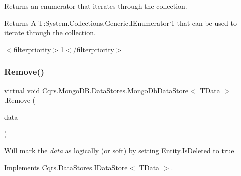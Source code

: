 Returns an enumerator that iterates through the collection. 

\begin{DoxyReturn}{Returns}
A T\+:\+System.\+Collections.\+Generic.\+I\+Enumerator`1 that can be used to iterate through the collection. 
\end{DoxyReturn}
$<$filterpriority$>$1$<$/filterpriority$>$ \mbox{\label{classCqrs_1_1MongoDB_1_1DataStores_1_1MongoDbDataStore_a14b43546e8d1e1832358e1cf2f8535f1_a14b43546e8d1e1832358e1cf2f8535f1}} 
\subsubsection{\texorpdfstring{Remove()}{Remove()}}
{\footnotesize\ttfamily virtual void \hyperlink{classCqrs_1_1MongoDB_1_1DataStores_1_1MongoDbDataStore}{Cqrs.\+Mongo\+D\+B.\+Data\+Stores.\+Mongo\+Db\+Data\+Store}$<$ T\+Data $>$.Remove (\begin{DoxyParamCaption}\item[{T\+Data}]{data }\end{DoxyParamCaption})\hspace{0.3cm}{\ttfamily [virtual]}}



Will mark the {\itshape data}  as logically (or soft) by setting Entity.\+Is\+Deleted to true 



Implements \hyperlink{interfaceCqrs_1_1DataStores_1_1IDataStore_a7ef540796bbe4257296841590bc23478_a7ef540796bbe4257296841590bc23478}{Cqrs.\+Data\+Stores.\+I\+Data\+Store$<$ T\+Data $>$}.

\mbox{\label{classCqrs_1_1MongoDB_1_1DataStores_1_1MongoDbDataStore_ac0cb8626e8f8ab0275a31e88a920ee3e_ac0cb8626e8f8ab0275a31e88a920ee3e}} 
